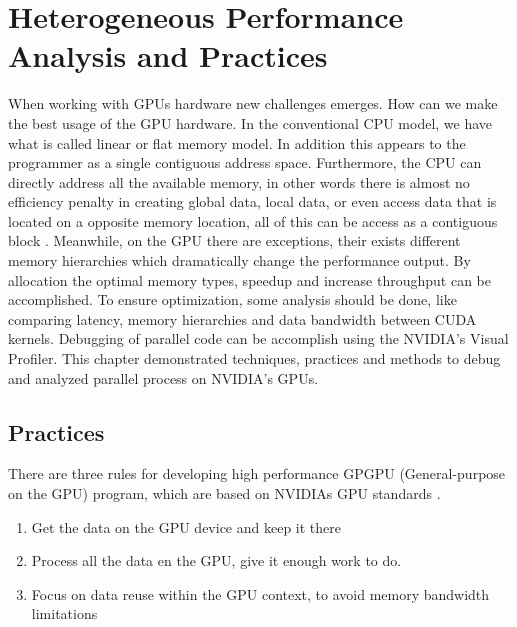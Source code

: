 \chapter{Heterogeneous Performance Analysis and Practices} %

\label{Heterogeneous Performance Analysis and Practices} %


When working with GPUs hardware new challenges emerges. How can we make the best usage of the GPU hardware. In the conventional CPU model, we have what is called linear or flat memory model. In addition this appears to the programmer as a single contiguous address space. Furthermore, the CPU can directly address all the available memory, in other words there is almost no efficiency penalty in creating global data, local data, or even access data that is located on a opposite memory location, all of this can be access as a contiguous block \cite{cook}. Meanwhile, on the GPU there are exceptions, their exists different memory hierarchies which dramatically change the performance output. By allocation the optimal memory types, speedup and increase throughput can be accomplished. To ensure optimization, some analysis should be done, like comparing latency, memory hierarchies and data bandwidth between CUDA kernels. Debugging of parallel code can be accomplish using the NVIDIA's Visual Profiler. This chapter demonstrated techniques, practices and methods to debug and analyzed parallel process on NVIDIA's GPUs.

\section{Practices}

There are three rules for developing high performance GPGPU (General-purpose on the GPU) program, which are based on NVIDIAs GPU standards \cite{design}.

\begin{enumerate}
  \item Get the data on the GPU device and keep it there
  \item Process all the data en the GPU, give it enough work to do.
  \item Focus on data reuse within the GPU context, to avoid memory bandwidth limitations
\end{enumerate}

